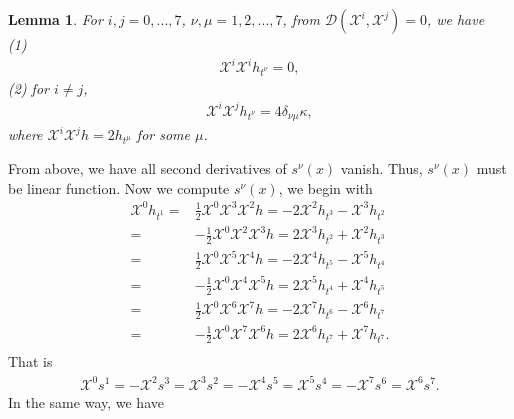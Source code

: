 \documentclass[reqno,12pt]{amsart}
\numberwithin{equation}{section}
\theoremstyle{plain}
\newtheorem{lemma}[theorem]{Lemma}
\theoremstyle{definition}
\begin{document}
\begin{lemma}
For  $i,j=0,...,7$, $\nu,\mu=1,2,...,7$, from $\mathcal{D}(\mathscr{X}^i,\mathscr{X}^j)=0$, we have\\
(1)
\begin{align}\label{4.15}
    \mathscr{X}^i \mathscr{X}^i h_{t^\nu}=0,
\end{align}
(2)
for $i\neq j$,
\begin{align}\label{4.17}
    \mathscr{X}^i \mathscr{X}^j h_{t^\nu}= 4\delta_{\nu\mu}\kappa,
\end{align}
where $\mathscr{X}^i \mathscr{X}^j h=2h_{t^\mu}$ for some $\mu$.

    
\end{lemma}
From above, we have all second derivatives of $s^\nu(x)$ vanish. Thus, $s^\nu(x)$ must be linear function.
Now we compute $s^\nu(x)$, we begin with
\begin{equation}
    \begin{aligned}
        \mathscr{X}^0 h_{t^1}=&\frac{1}{2}\mathscr{X}^0\mathscr{X}^3\mathscr{X}^2 h=-2\mathscr{X}^2 h_{t^3}-\mathscr{X}^3 h_{t^2}\\ 
=&-\frac{1}{2}\mathscr{X}^0\mathscr{X}^2\mathscr{X}^3 h=2\mathscr{X}^3 h_{t^2}+\mathscr{X}^2 h_{t^3}\\
=&\frac{1}{2}\mathscr{X}^0\mathscr{X}^5\mathscr{X}^4 h=-2\mathscr{X}^4 h_{t^5}-\mathscr{X}^5 h_{t^4}\\
=&-\frac{1}{2}\mathscr{X}^0\mathscr{X}^4\mathscr{X}^5 h=2\mathscr{X}^5 h_{t^4}+\mathscr{X}^4 h_{t^5}\\
=&\frac{1}{2}\mathscr{X}^0\mathscr{X}^6\mathscr{X}^7 h=-2\mathscr{X}^7 h_{t^6}-\mathscr{X}^6 h_{t^7}\\
=&-\frac{1}{2}\mathscr{X}^0\mathscr{X}^7\mathscr{X}^6 h=2\mathscr{X}^6 h_{t^7}+\mathscr{X}^7 h_{t^7}.\\  
    \end{aligned}\end{equation}
   That is 
   \small{\begin{align}
        \mathscr{X}^0 s^1=-\mathscr{X}^2 s^3=\mathscr{X}^3 s^2=-\mathscr{X}^4 s^5=\mathscr{X}^5 s^4=-\mathscr{X}^7s^6=\mathscr{X}^6 s^7.
    \end{align}}
    In the same way, we have
\end{document}

